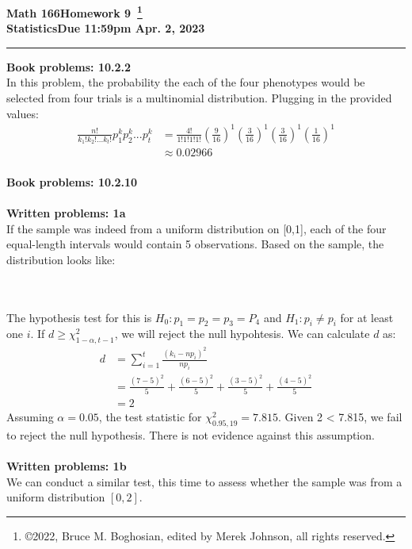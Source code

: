 \documentclass [12pt] {article}
\newcommand{\class}{Math 166}
\newcommand{\classname}{Statistics}
\newcommand{\assignment}{Homework 9}
\newcommand{\duedate}{Due 11:59pm Apr. 2, 2023}
\begin{document}
\thispagestyle{empty}

\noindent \textbf{\class \hfill \assignment~\footnote{\copyright 2022, Bruce M. Boghosian, edited by Merek Johnson, all rights reserved.}}\\
\textbf{\classname \hfill \duedate} \\
\rule[1ex]{\textwidth}{.1pt}
\textbf{Book problems: 10.2.2}\\
In this problem, the probability the each of the four phenotypes would be selected from four trials is a multinomial distribution. Plugging in the provided values:
\begin{align*}
\frac{n!}{k_1!k_2!... k_t!}p_1^kp_2^k...p_t^k
&= \frac{4!}{1!1!1!1!}\left(\frac{9}{16}\right)^1\left(\frac{3}{16}\right)^1\left(\frac{3}{16}\right)^1\left(\frac{1}{16}\right)^1\\
&\approx 0.02966
\end{align*}
\\
\textbf{Book problems: 10.2.10}\\
\\
\textbf{Written problems: 1a}\\
If the sample was indeed from a uniform distribution on [0,1], each of the four equal-length intervals would contain 5 observations. Based on the sample, the distribution looks like:\\
\\
\\	
The hypothesis test for this is $H_0: p_1 = p_2 = p_3 = P_4$ and $H_1: p_i \neq p_i$ for at least one $i$. If $d \geq \chi_{1-\alpha,t-1}^2$, we will reject the null hypohtesis. We can calculate $d$ as:
\begin{align*}
d
&= \sum_{i=1}^t\frac{(k_i-np_i)^2}{np_i}\\
&= \frac{(7-5)^2}{5}+\frac{(6-5)^2}{5}+\frac{(3-5)^2}{5}+\frac{(4-5)^2}{5}\\
&= 2
\end{align*}
Assuming $\alpha = 0.05$, the test statistic for $\chi_{0.95,19}^2 =  7.815$. Given 2 < 7.815, we fail to reject the null hypothesis. There is not evidence against this assumption.\\
\\
\textbf{Written problems: 1b}\\
We can conduct a similar test, this time to assess whether the sample was from a uniform distribution $[0,2]$.
\end{document}
